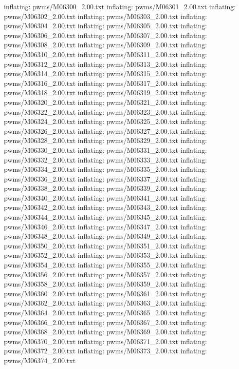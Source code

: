 \documentclass[letterpaper,10pt,english]{sphinxmanual}
\begin{document}
{\begin{sphinxVerbatim}[commandchars=\\\{\}]
  inflating: pwms/M06300\_2.00.txt
  inflating: pwms/M06301\_2.00.txt
  inflating: pwms/M06302\_2.00.txt
  inflating: pwms/M06303\_2.00.txt
  inflating: pwms/M06304\_2.00.txt
  inflating: pwms/M06305\_2.00.txt
  inflating: pwms/M06306\_2.00.txt
  inflating: pwms/M06307\_2.00.txt
  inflating: pwms/M06308\_2.00.txt
  inflating: pwms/M06309\_2.00.txt
  inflating: pwms/M06310\_2.00.txt
  inflating: pwms/M06311\_2.00.txt
  inflating: pwms/M06312\_2.00.txt
  inflating: pwms/M06313\_2.00.txt
  inflating: pwms/M06314\_2.00.txt
  inflating: pwms/M06315\_2.00.txt
  inflating: pwms/M06316\_2.00.txt
  inflating: pwms/M06317\_2.00.txt
  inflating: pwms/M06318\_2.00.txt
  inflating: pwms/M06319\_2.00.txt
  inflating: pwms/M06320\_2.00.txt
  inflating: pwms/M06321\_2.00.txt
  inflating: pwms/M06322\_2.00.txt
  inflating: pwms/M06323\_2.00.txt
  inflating: pwms/M06324\_2.00.txt
  inflating: pwms/M06325\_2.00.txt
  inflating: pwms/M06326\_2.00.txt
  inflating: pwms/M06327\_2.00.txt
  inflating: pwms/M06328\_2.00.txt
  inflating: pwms/M06329\_2.00.txt
  inflating: pwms/M06330\_2.00.txt
  inflating: pwms/M06331\_2.00.txt
  inflating: pwms/M06332\_2.00.txt
  inflating: pwms/M06333\_2.00.txt
  inflating: pwms/M06334\_2.00.txt
  inflating: pwms/M06335\_2.00.txt
  inflating: pwms/M06336\_2.00.txt
  inflating: pwms/M06337\_2.00.txt
  inflating: pwms/M06338\_2.00.txt
  inflating: pwms/M06339\_2.00.txt
  inflating: pwms/M06340\_2.00.txt
  inflating: pwms/M06341\_2.00.txt
  inflating: pwms/M06342\_2.00.txt
  inflating: pwms/M06343\_2.00.txt
  inflating: pwms/M06344\_2.00.txt
  inflating: pwms/M06345\_2.00.txt
  inflating: pwms/M06346\_2.00.txt
  inflating: pwms/M06347\_2.00.txt
  inflating: pwms/M06348\_2.00.txt
  inflating: pwms/M06349\_2.00.txt
  inflating: pwms/M06350\_2.00.txt
  inflating: pwms/M06351\_2.00.txt
  inflating: pwms/M06352\_2.00.txt
  inflating: pwms/M06353\_2.00.txt
  inflating: pwms/M06354\_2.00.txt
  inflating: pwms/M06355\_2.00.txt
  inflating: pwms/M06356\_2.00.txt
  inflating: pwms/M06357\_2.00.txt
  inflating: pwms/M06358\_2.00.txt
  inflating: pwms/M06359\_2.00.txt
  inflating: pwms/M06360\_2.00.txt
  inflating: pwms/M06361\_2.00.txt
  inflating: pwms/M06362\_2.00.txt
  inflating: pwms/M06363\_2.00.txt
  inflating: pwms/M06364\_2.00.txt
  inflating: pwms/M06365\_2.00.txt
  inflating: pwms/M06366\_2.00.txt
  inflating: pwms/M06367\_2.00.txt
  inflating: pwms/M06368\_2.00.txt
  inflating: pwms/M06369\_2.00.txt
  inflating: pwms/M06370\_2.00.txt
  inflating: pwms/M06371\_2.00.txt
  inflating: pwms/M06372\_2.00.txt
  inflating: pwms/M06373\_2.00.txt
  inflating: pwms/M06374\_2.00.txt

\end{sphinxVerbatim}}
\end{document}
